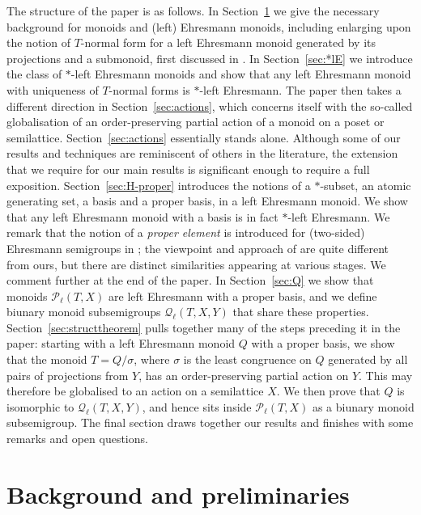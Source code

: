 \documentclass[12pt]{amsart}
\theoremstyle{definition}
\theoremstyle{definition}
\numberwithin{them}{section}
\numberwithin{equation}{section}
\begin{document}
The structure of the paper is as follows. 
In Section~\ref{sec:pre} we give the necessary background for monoids and  (left) Ehresmann monoids, including enlarging upon  the notion of $T$-normal form for a left Ehresmann monoid generated  by its projections and  a submonoid, first discussed in \cite{BGG}.
In Section~\ref{sec:*lE} we introduce the class of $*$-left Ehresmann monoids and show that any left Ehresmann monoid with uniqueness of $T$-normal forms is $*$-left Ehresmann.
The paper then takes a different direction in Section~\ref{sec:actions}, which concerns itself with the so-called globalisation of an order-preserving  partial action of a monoid on a poset or semilattice. Section~\ref{sec:actions} essentially stands alone. Although some of our results and  techniques are reminiscent of others in the literature, the extension that we require for our main results is significant enough to require a full exposition. 
Section~\ref{sec:H-proper} introduces the notions of 
 a $*$-subset, an atomic generating set, a   basis and a  proper basis, in a left Ehresmann monoid. We show that any left Ehresmann monoid with a basis is in fact $*$-left Ehresmann. We remark that the notion of a {\em proper element} is
introduced for (two-sided) Ehresmann semigroups in \cite{KL}; the viewpoint and approach of \cite{KL} are quite different from ours, but there are distinct similarities appearing at various stages. We comment further at the end of the paper. 
In Section~\ref{sec:Q} we show that monoids $\mathcal{P}_\ell(T,X)$ are left Ehresmann with a proper basis, and we define biunary monoid subsemigroups $\mathcal{Q}_\ell(T,X,Y)$ that share these properties.
Section~\ref{sec:structtheorem} pulls together many of the steps preceding it in the paper: starting with a  left Ehresmann monoid $Q$ with a proper basis, we show that the monoid $T=Q/\sigma$, where $\sigma$ is the least congruence on $Q$ generated by all pairs of projections from $Y$, has an order-preserving partial action on $Y$. This may therefore  be globalised to an action on a semilattice $X$. We then prove that  $Q$ is isomorphic to $\mathcal{Q}_\ell(T,X,Y)$, and hence sits inside $\mathcal{P}_\ell(T,X)$ as a biunary monoid subsemigroup. 
The final section draws together our results and finishes with 
some remarks and open questions. 


\section{Background and preliminaries}\label{sec:pre}
\end{document}
